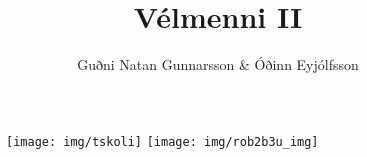 \documentclass{article}
\begin{document}
\title{Vélmenni II}
\author{Guðni Natan Gunnarsson \& Óðinn Eyjólfsson}
\maketitle
\begin{figure}[h]
\centering
\texttt{[image: img/tskoli]}
\texttt{[image: img/rob2b3u\_img]}
\end{figure}
\newpage
\tableofcontents
\newpage



\newpage



\newpage



\newpage

\end{document}
